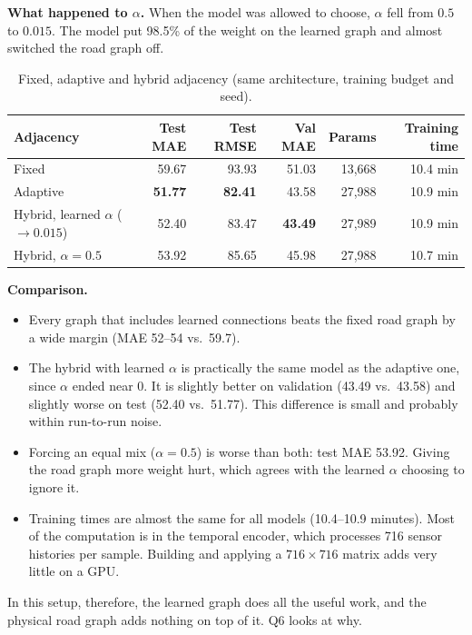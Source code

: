 \documentclass[11pt, a4paper]{article}
\begin{document}
\textbf{What happened to $\alpha$.} When the model was allowed to choose, $\alpha$ fell from $0.5$ to $0.015$. The model put 98.5\% of the weight on the learned graph and almost switched the road graph off.

\begin{table}[H]
\centering
\small
\begin{tabular}{@{}lrrrrr@{}}
\toprule
Adjacency & Test MAE & Test RMSE & Val MAE & Params & Training time \\
\midrule
Fixed                     & 59.67 & 93.93 & 51.03 & 13{,}668 & 10.4 min \\
Adaptive                  & \textbf{51.77} & \textbf{82.41} & 43.58 & 27{,}988 & 10.9 min \\
Hybrid, learned $\alpha$ ($\to 0.015$) & 52.40 & 83.47 & \textbf{43.49} & 27{,}989 & 10.9 min \\
Hybrid, $\alpha = 0.5$    & 53.92 & 85.65 & 45.98 & 27{,}988 & 10.7 min \\
\bottomrule
\end{tabular}
\caption{Fixed, adaptive and hybrid adjacency (same architecture, training budget and seed).}
\end{table}

\textbf{Comparison.}
\begin{itemize}
\item Every graph that includes learned connections beats the fixed road graph by a wide margin (MAE 52--54 vs.\ 59.7).
\item The hybrid with learned $\alpha$ is practically the same model as the adaptive one, since $\alpha$ ended near 0. It is slightly better on validation (43.49 vs.\ 43.58) and slightly worse on test (52.40 vs.\ 51.77). This difference is small and probably within run-to-run noise.
\item Forcing an equal mix ($\alpha = 0.5$) is worse than both: test MAE 53.92. Giving the road graph more weight hurt, which agrees with the learned $\alpha$ choosing to ignore it.
\item Training times are almost the same for all models (10.4--10.9 minutes). Most of the computation is in the temporal encoder, which processes 716 sensor histories per sample. Building and applying a $716 \times 716$ matrix adds very little on a GPU.
\end{itemize}

In this setup, therefore, the learned graph does all the useful work, and the physical road graph adds nothing on top of it. Q6 looks at why.
\end{document}
